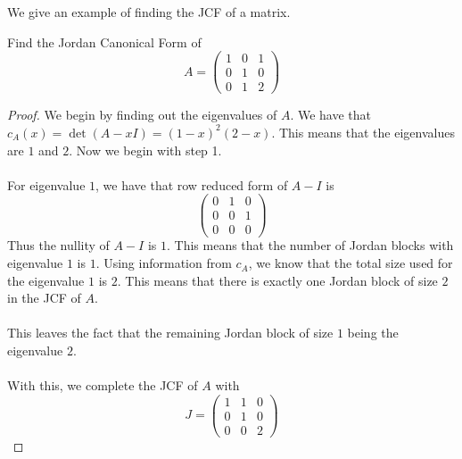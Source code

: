 \documentclass[a4paper]{article}
\begin{document}
We give an example of finding the JCF of a matrix. 

\begin{eg}{}{} Find the Jordan Canonical Form of $$A=\begin{pmatrix}
1 & 0 & 1\\
0 & 1 & 0\\
0 & 1 & 2
\end{pmatrix}$$ \tcbline
\begin{proof}
We begin by finding out the eigenvalues of $A$. We have that $c_A(x)=\det(A-xI)=(1-x)^2(2-x)$. This means that the eigenvalues are $1$ and $2$. Now we begin with step 1. \\~\\
For eigenvalue $1$, we have that row reduced form of $A-I$ is $$\begin{pmatrix}
0 & 1 & 0\\
0 & 0 & 1\\
0 & 0 & 0
\end{pmatrix}$$
Thus the nullity of $A-I$ is $1$. This means that the number of Jordan blocks with eigenvalue $1$ is $1$. Using information from $c_A$, we know that the total size used for the eigenvalue $1$ is $2$. This means that there is exactly one Jordan block of size $2$ in the JCF of $A$. \\~\\
This leaves the fact that the remaining Jordan block of size $1$ being the eigenvalue $2$. \\~\\
With this, we complete the JCF of $A$ with $$J=\begin{pmatrix}
1 & 1 & 0\\
0 & 1 & 0\\
0 & 0 & 2
\end{pmatrix}$$


\end{proof}
\end{eg}
\end{document}
